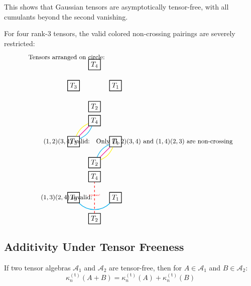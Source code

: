 This shows that Gaussian tensors are asymptotically tensor-free, with all cumulants beyond the second vanishing.

For four rank-3 tensors, the valid colored non-crossing pairings are severely restricted:
\[
\begin{tikzpicture}[baseline=-.5em, scale=0.7]
   \node at (-2,2) {\small Tensors arranged on circle:};
   \foreach \i in {1,2,3,4} {
      \node[draw, thick] (T\i) at (90-90*\i:1.5) {$T_{\i}$};
   }
   
   \begin{scope}[yshift=-4cm]
      \node at (-2,0) {\small $(1,2)(3,4)$ valid:};
      \foreach \i in {1,2,3,4} {
         \node[draw, thick] (S\i) at (90-90*\i:1.5) {$T_{\i}$};
      }
      \draw[cyan, thick] (S1) to[bend right=20] (S2);
      \draw[magenta, thick] (S1) to (S2);
      \draw[yellow, thick] (S1) to[bend left=20] (S2);
      \draw[cyan, thick] (S3) to[bend right=20] (S4);
      \draw[magenta, thick] (S3) to (S4);
      \draw[yellow, thick] (S3) to[bend left=20] (S4);
   \end{scope}
   
   \begin{scope}[yshift=-8cm]
      \node at (-2,0) {\small $(1,3)(2,4)$ invalid:};
      \foreach \i in {1,2,3,4} {
         \node[draw, thick] (R\i) at (90-90*\i:1.5) {$T_{\i}$};
      }
      \draw[cyan, thick] (R1) to[bend left=45] (R3);
      \draw[red, thick, dashed] (R2) to (R4) node[midway, above] {\tiny crosses!};
   \end{scope}
   
   \node at (5,-4) {\small Only $(1,2)(3,4)$ and $(1,4)(2,3)$ are non-crossing};
\end{tikzpicture}
\]

\subsection{Additivity Under Tensor Freeness}

If two tensor algebras $\mathcal{A}_1$ and $\mathcal{A}_2$ are tensor-free, then for $A \in \mathcal{A}_1$ and $B \in \mathcal{A}_2$:
\[
   \kappa_n^{(\mathrm{t})}(A + B) = \kappa_n^{(\mathrm{t})}(A) + \kappa_n^{(\mathrm{t})}(B)
\]

